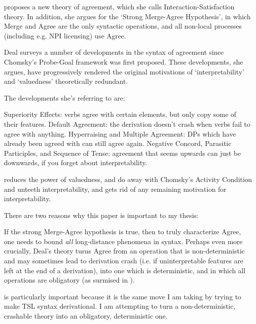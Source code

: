 
\citet{deal2025} proposes a new theory of agreement, which she calls Interaction-Satisfaction theory. In addition, she argues for the `Strong Merge-Agree Hypothesis', in which Merge and Agree are the only syntactic operations, and all non-local processes (including e.g. NPI licensing) use Agree.

Deal surveys a number of developments in the syntax of agreement since Chomsky's \citeyearpar{chomsky2001} Probe-Goal framework was first proposed. These developments, she argues, have progressively rendered the original motivations of `interpretability' and `valuedness' theoretically redundant.

The developments she's referring to are:

\pex \a Superiority Effects: verbs agree with certain elements, but only copy some of their features.
    \a Default Agreement: the derivation doesn't crash when verbs fail to agree with anything.
    \a Hyperraising and Multiple Agreement: DPs which have already been agreed with can still agree again.
    \a Negative Concord, Parasitic Participles, and Sequence of Tense: agreement that seems upwards can just be downwards, if you forget about interpretability.
\xe

\Last[a] reduces the power of valuedness, \Last[b] and \Last[c] do away with Chomsky's Activity Condition and unteeth interpretability, and \Last[d] gets rid of any remaining motivation for interpretability.

There are two reasons why this paper is important to my thesis:

\pex \a If the strong Merge-Agree hypothesis is true, then to truly characterize Agree, one needs to bound \textit{all} long-distance phenomena in syntax.
    \a Perhaps even more crucially, Deal's theory turns Agree from an operation that is non-deterministic and may sometimes lead to derivation crash (i.e. if uninterpretable features are left at the end of a derivation), into one which is deterministic, and in which all operations are obligatory (as surmised in \citealt{preminger2014}).
\xe

\Last[b] is particularly important because it is the same move I am taking by trying to make TSL syntax derivational. I am attempting to turn a non-deterministic, crashable theory into an obligatory, deterministic one.
